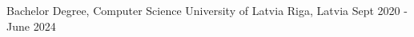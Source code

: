 

\begin{cventries}

  \cventry
    {Bachelor Degree, Computer Science} %
    {University of Latvia} %
    {Riga, Latvia} %
    {Sept 2020 - June 2024} %
    {
      \begin{cvitems} %
      \end{cvitems}
    }
\end{cventries}
